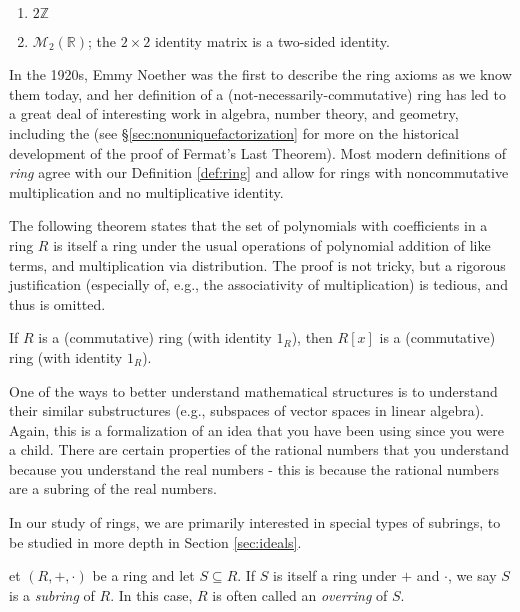 \documentclass[english,course]{lecture}
\newenvironment{solution}[1][Solution]{\begin{trivlist}\pushQED{\qed}\item[\hskip \labelsep  \bfseries #1{}.\hspace{10pt}]}{\popQED\end{trivlist}}\renewcommand{\qedsymbol}{$\checkmark$}{\newenvironment{answer}{\renewcommand\qedsymbol{$\blacklozenge$}\begin{proof}[Answer]}{\end{proof}}}\newenvironment{answer}[1][Answer]{\begin{trivlist}\pushQED{\qed}\item[\hskip \labelsep  \bfseries #1{}.\hspace{10pt}]}{\popQED\end{trivlist}}\renewcommand{\qedsymbol}{$\lozenge$}
\theoremstyle{plain}
\newenvironment{definition}[1]
  {\renewcommand\theinnerdefinition{#1}\innerdefinition}
  {\endinnerdefinition}
\def\Z{{\mathbb Z}}
\def\R{{\mathbb R}}
\def\presnotes{}
\begin{document}
\begin{solution}
	\
	
	\begin{enumerate}
		\item $2\Z$
		\item $\mathcal{M}_2(\R)$; the $2\times 2$ identity matrix is a two-sided identity.
	\end{enumerate}
\end{solution}

\presnotes

In the 1920s, Emmy Noether was the first to describe the ring axioms as we know them today, and her definition of a (not-necessarily-commutative) ring has led to a great deal of interesting work in algebra, number theory, and geometry, including the (see \S \ref{sec:nonuniquefactorization} for more on the historical development of the proof of Fermat's Last Theorem). 
Most modern definitions of \emph{ring} agree with our Definition \ref{def:ring} and allow for rings with noncommutative multiplication and no multiplicative identity.


The following theorem states that the set of polynomials with coefficients in a ring $R$ is itself a ring under the usual operations of polynomial addition of like terms, and multiplication via distribution.
The proof is not tricky, but a rigorous justification (especially of, e.g., the associativity of multiplication) is tedious, and thus is omitted. 


\begin{unnumberedtheorem}
	If $R$ is a (commutative) ring (with identity $1_R$), then $R[x]$ is a (commutative) ring (with identity $1_R$).
\end{unnumberedtheorem}

One of the ways to better understand mathematical structures is to understand their similar substructures (e.g., subspaces of vector spaces in linear algebra). Again, this is a formalization of an idea that you have been using since you were a child. There are certain properties of the rational numbers that you understand because you understand the real numbers - this is because the rational numbers are a subring of the real numbers.

In our study of rings, we are primarily interested in special types of subrings, to be studied in more depth in Section \ref{sec:ideals}.

\begin{definition}
	Let $(R,+,\cdot)$ be a ring and let $S\subseteq R$.
	If $S$ is itself a ring under $+$ and $\cdot$, we say $S$ is a \emph{subring} of $R$. 
	In this case, $R$ is often called an \emph{overring} of $S$.
\end{definition}
\end{document}
